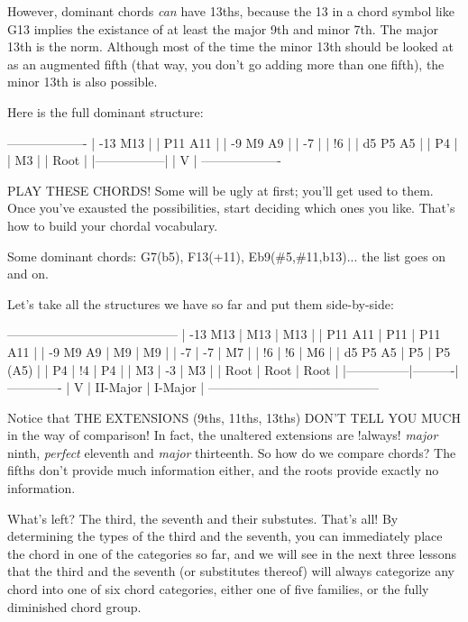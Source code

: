 However, dominant chords \emph{can} have 13ths, because the 13 in a chord symbol
like G13 implies the existance of at least the major 9th and minor 7th.
The major 13th is the norm. Although most of the time the minor 13th should
be looked at as an augmented fifth (that way, you don't go adding more than
one fifth), the minor 13th is also possible.

Here is the full dominant structure:

-------------------
| -13  M13        |
|      P11  A11   |
| -9    M9   A9   |
|       -7        |
|       !6        |
|  d5   P5   A5   |
|       P4        |
|       M3        |
|      Root       |
|-----------------|
|        V        |
-------------------

PLAY THESE CHORDS! Some will be ugly at first; you'll get used to them. Once
you've exausted the possibilities, start deciding which ones you like. That's
how to build your chordal vocabulary.

Some dominant chords: G7(b5), F13(+11), Eb9(\#5,\#11,b13)... the list goes on and
on.

Let's take all the structures we have so far and put them side-by-side:

-----------------------------------------
| -13  M13      |   M13    |  M13       |
|      P11  A11 |   P11    |  P11  A11  |
|  -9   M9   A9 |    M9    |   M9       |
|       -7      |    -7    |   M7       |
|       !6      |    !6    |   M6       |
|  d5   P5   A5 |    P5    |   P5 (A5)  |
|       P4      |    !4    |   P4       |
|       M3      |    -3    |   M3       |
|      Root     |   Root   |  Root      |
|---------------|----------|-------------
|        V      | II-Major | I-Major    |
-----------------------------------------

Notice that THE EXTENSIONS (9ths, 11ths, 13ths) DON'T TELL YOU MUCH in the way
of comparison! In fact, the unaltered extensions are !always! \emph{major} ninth,
\emph{perfect} eleventh and \emph{major} thirteenth. So how do we compare chords? The
fifths don't provide much information either, and the roots provide exactly no
information. 

What's left? The third, the seventh and their substutes. That's all! By
determining the types of the third and the seventh, you can immediately
place the chord in one of the categories so far, and we will see in the
next three lessons that the third and the seventh (or substitutes
thereof) will always categorize any chord into one of six chord
categories, either one of five families, or the fully diminished chord
group.  

